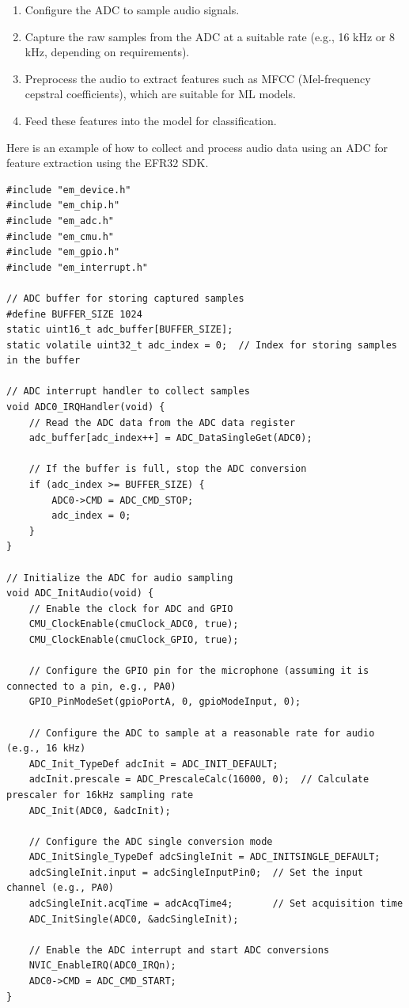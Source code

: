 \documentclass[
  9pt,
  letterpaper,
  abstract,
  titlepage]{scrbook}
\begin{document}
\begin{enumerate}
\def\labelenumi{\arabic{enumi}.}
\item
  Configure the ADC to sample audio signals.
\item
  Capture the raw samples from the ADC at a suitable rate (e.g., 16 kHz
  or 8 kHz, depending on requirements).
\item
  Preprocess the audio to extract features such as MFCC (Mel-frequency
  cepstral coefficients), which are suitable for ML models.
\item
  Feed these features into the model for classification.
\end{enumerate}

Here is an example of how to collect and process audio data using an ADC
for feature extraction using the EFR32 SDK.

\begin{verbatim}
#include "em_device.h"
#include "em_chip.h"
#include "em_adc.h"
#include "em_cmu.h"
#include "em_gpio.h"
#include "em_interrupt.h"

// ADC buffer for storing captured samples
#define BUFFER_SIZE 1024
static uint16_t adc_buffer[BUFFER_SIZE];
static volatile uint32_t adc_index = 0;  // Index for storing samples in the buffer

// ADC interrupt handler to collect samples
void ADC0_IRQHandler(void) {
    // Read the ADC data from the ADC data register
    adc_buffer[adc_index++] = ADC_DataSingleGet(ADC0);

    // If the buffer is full, stop the ADC conversion
    if (adc_index >= BUFFER_SIZE) {
        ADC0->CMD = ADC_CMD_STOP;
        adc_index = 0;
    }
}

// Initialize the ADC for audio sampling
void ADC_InitAudio(void) {
    // Enable the clock for ADC and GPIO
    CMU_ClockEnable(cmuClock_ADC0, true);
    CMU_ClockEnable(cmuClock_GPIO, true);

    // Configure the GPIO pin for the microphone (assuming it is connected to a pin, e.g., PA0)
    GPIO_PinModeSet(gpioPortA, 0, gpioModeInput, 0);

    // Configure the ADC to sample at a reasonable rate for audio (e.g., 16 kHz)
    ADC_Init_TypeDef adcInit = ADC_INIT_DEFAULT;
    adcInit.prescale = ADC_PrescaleCalc(16000, 0);  // Calculate prescaler for 16kHz sampling rate
    ADC_Init(ADC0, &adcInit);

    // Configure the ADC single conversion mode
    ADC_InitSingle_TypeDef adcSingleInit = ADC_INITSINGLE_DEFAULT;
    adcSingleInit.input = adcSingleInputPin0;  // Set the input channel (e.g., PA0)
    adcSingleInit.acqTime = adcAcqTime4;       // Set acquisition time
    ADC_InitSingle(ADC0, &adcSingleInit);

    // Enable the ADC interrupt and start ADC conversions
    NVIC_EnableIRQ(ADC0_IRQn);
    ADC0->CMD = ADC_CMD_START;
}
\end{verbatim}
\end{document}
